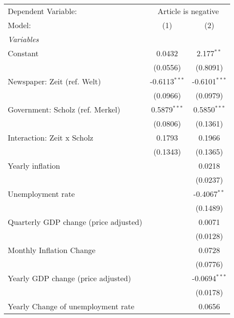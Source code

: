 
\begingroup
\centering
\begin{tabular}{lcc}
   \tabularnewline \midrule \midrule
   Dependent Variable: & \multicolumn{2}{c}{Article is negative}\\
   Model:                                & (1)             & (2)\\  
   \midrule
   \emph{Variables}\\
   Constant                              & 0.0432          & 2.177$^{**}$\\   
                                         & (0.0556)        & (0.8091)\\   
   Newspaper: Zeit (ref. Welt)           & -0.6113$^{***}$ & -0.6101$^{***}$\\   
                                         & (0.0966)        & (0.0979)\\   
   Government: Scholz (ref. Merkel)      & 0.5879$^{***}$  & 0.5850$^{***}$\\   
                                         & (0.0806)        & (0.1361)\\   
   Interaction: Zeit x Scholz            & 0.1793          & 0.1966\\   
                                         & (0.1343)        & (0.1365)\\   
   Yearly inflation                      &                 & 0.0218\\   
                                         &                 & (0.0237)\\   
   Unemployment rate                     &                 & -0.4067$^{**}$\\   
                                         &                 & (0.1489)\\   
   Quarterly GDP change (price adjusted) &                 & 0.0071\\   
                                         &                 & (0.0128)\\   
   Monthly Inflation Change              &                 & 0.0728\\   
                                         &                 & (0.0776)\\   
   Yearly GDP change (price adjusted)    &                 & -0.0694$^{***}$\\   
                                         &                 & (0.0178)\\   
   Yearly Change of unemployment rate    &                 & 0.0656\\   

\end{tabular}

